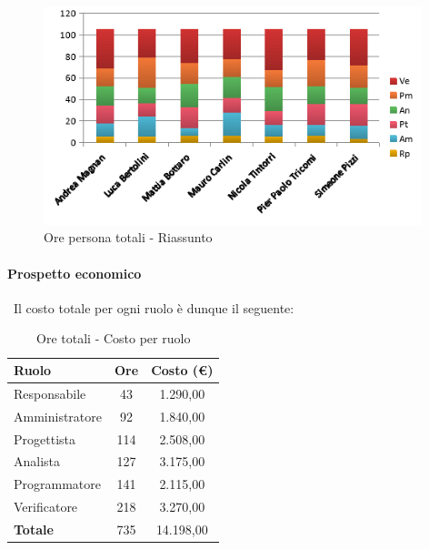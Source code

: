 \documentclass[./PianoDiProgetto.tex]{subfiles}
\begin{document}
	\begin{figure}[H]
		\centering
		\includegraphics[width=11cm, trim=1cm 0cm 1cm 0cm]{grafici/TOT-persona}
			\caption{Ore persona totali - Riassunto}
	\end{figure}

\newpage

	\paragraph{Prospetto economico}\
					Il costo totale per ogni ruolo è dunque il seguente:
	\begin{table}[H]
		\centering
		\begin{tabular}{l * {2}{c}}
			\toprule
			\textbf{Ruolo} & \textbf{Ore} & \textbf{Costo (\euro{})} \\
			\midrule
			Responsabile & 43    &  1.290,00 \\
			Amministratore  & 92   &  1.840,00 \\
			Progettista  & 114   &  2.508,00 \\
			Analista & 127   &  3.175,00 \\
			Programmatore  & 141   &  2.115,00 \\
			Verificatore  & 218   &  3.270,00 \\
			\midrule
			\textbf{Totale}  & 735  &  14.198,00 \\
			\bottomrule

		\end{tabular}
		\caption{Ore totali - Costo per ruolo}
	\end{table}

\vspace{35 mm}
\end{document}
